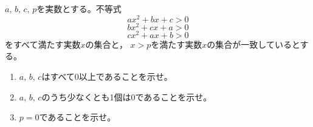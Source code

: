 \documentclass[../../main.tex]{subfiles}
\begin{document}
$a, \, b, \, c, \, p$を実数とする。不等式
\[ ax^2+bx+c>0 \]
\[ bx^2+cx+a>0 \]
\[ cx^2+ax+b>0 \]
をすべて満たす実数$x$の集合と，
$x>p$を満たす実数$x$の集合が一致しているとする。
\begin{enumerate}
  \item$a, \, b, \, c$はすべて0以上であることを示せ。
  \item$a, \, b, \, c$のうち少なくとも1個は0であることを示せ。
  \item$p=0$であることを示せ。
\end{enumerate}
\end{document}
